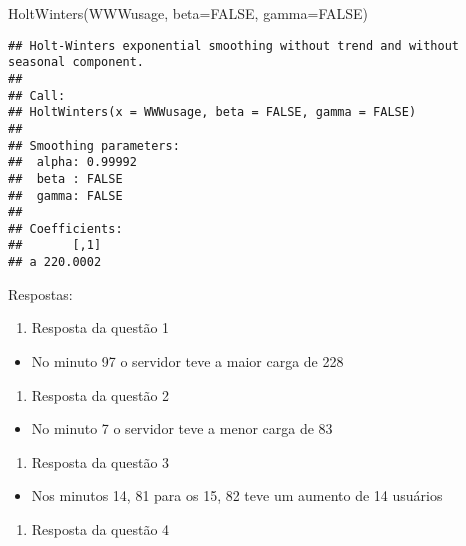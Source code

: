 \documentclass[
]{article}
\newenvironment{Shaded}{\begin{snugshade}}{\end{snugshade}}
\newcommand{\AttributeTok}[1]{\textcolor[rgb]{0.77,0.63,0.00}{#1}}
\newcommand{\ConstantTok}[1]{\textcolor[rgb]{0.00,0.00,0.00}{#1}}
\newcommand{\FunctionTok}[1]{\textcolor[rgb]{0.00,0.00,0.00}{#1}}
\newcommand{\NormalTok}[1]{#1}
\providecommand{\tightlist}{%
  \setlength{\itemsep}{0pt}\setlength{\parskip}{0pt}}
\begin{document}
\begin{Shaded}
\begin{Highlighting}[]
\FunctionTok{HoltWinters}\NormalTok{(WWWusage, }\AttributeTok{beta=}\ConstantTok{FALSE}\NormalTok{, }\AttributeTok{gamma=}\ConstantTok{FALSE}\NormalTok{)}
\end{Highlighting}
\end{Shaded}

\begin{verbatim}
## Holt-Winters exponential smoothing without trend and without seasonal component.
## 
## Call:
## HoltWinters(x = WWWusage, beta = FALSE, gamma = FALSE)
## 
## Smoothing parameters:
##  alpha: 0.99992
##  beta : FALSE
##  gamma: FALSE
## 
## Coefficients:
##       [,1]
## a 220.0002
\end{verbatim}

Respostas:

\begin{enumerate}
\def\labelenumi{\arabic{enumi}.}
\tightlist
\item
  Resposta da questão 1
\end{enumerate}

\begin{itemize}
\tightlist
\item
  No minuto 97 o servidor teve a maior carga de 228
\end{itemize}

\begin{enumerate}
\def\labelenumi{\arabic{enumi}.}
\setcounter{enumi}{1}
\tightlist
\item
  Resposta da questão 2
\end{enumerate}

\begin{itemize}
\tightlist
\item
  No minuto 7 o servidor teve a menor carga de 83
\end{itemize}

\begin{enumerate}
\def\labelenumi{\arabic{enumi}.}
\setcounter{enumi}{2}
\tightlist
\item
  Resposta da questão 3
\end{enumerate}

\begin{itemize}
\tightlist
\item
  Nos minutos 14, 81 para os 15, 82 teve um aumento de 14 usuários
\end{itemize}

\begin{enumerate}
\def\labelenumi{\arabic{enumi}.}
\setcounter{enumi}{3}
\tightlist
\item
  Resposta da questão 4
\end{enumerate}
\end{document}
